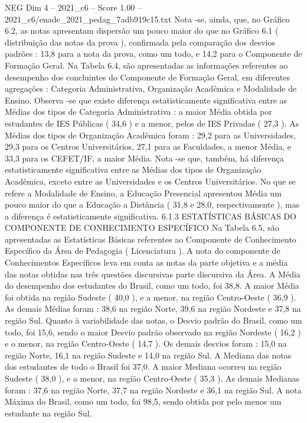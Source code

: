 \begin{textsample}{NEG Dim 4 – 2021\_c6 – Score 1.00 – 2021\_c6/enade\_2021\_pedag\_7adb919c15.txt}
Nota -se, ainda, que, no Gráfico 6.2, as notas apresentam dispersão um pouco maior do que no Gráfico 6.1 ( distribuição das notas da prova ), confirmada pela comparação dos desvios padrões : 13,8 para a nota da prova, como um todo, e 14,2 para o Componente de Formação Geral.
Na Tabela 6.4, são apresentadas as informações referentes ao desempenho dos concluintes do Componente de Formação Geral, em diferentes agregações : Categoria Administrativa, Organização Acadêmica e Modalidade de Ensino.
Observa -se que existe diferença estatisticamente significativa entre as Médias dos tipos de Categoria Administrativa : a maior Média obtida por estudantes de IES Públicas ( 34,6 ) e a menor, pelos de IES Privadas ( 27,3 ).
As Médias dos tipos de Organização Acadêmica foram : 29,2 para as Universidades, 29,3 para os Centros Universitários, 27,1 para as Faculdades, a menor Média, e 33,3 para os CEFET/IF, a maior Média.
Nota -se que, também, há diferença estatisticamente significativa entre as Médias dos tipos de Organização Acadêmica, exceto entre as Universidades e os Centros Universitários.
No que se refere a Modalidade de Ensino, a Educação Presencial apresentou Média um pouco maior do que a Educação a Distância ( 31,8 e 28,0, respectivamente ), mas a diferença é estatisticamente significativa. 6.1.3 ESTATÍSTICAS BÁSICAS DO COMPONENTE DE CONHECIMENTO ESPECÍFICO Na Tabela 6.5, são apresentadas as Estatísticas Básicas referentes ao Componente de Conhecimento Específico da Área de Pedagogia ( Licenciatura ).
A nota do componente de Conhecimentos Específicos leva em conta as notas da parte objetiva e a média das notas obtidas nas três questões discursivas parte discursiva da Área.
A Média do desempenho dos estudantes do Brasil, como um todo, foi 38,8.
A maior Média foi obtida na região Sudeste ( 40,0 ), e a menor, na região Centro-Oeste ( 36,9 ).
As demais Médias foram : 38,6 na região Norte, 39,6 na região Nordeste e 37,8 na região Sul.
Quanto à variabilidade das notas, o Desvio padrão do Brasil, como um todo, foi 15,6, sendo o maior Desvio padrão observado na região Nordeste ( 16,2 ) e o menor, na região Centro-Oeste ( 14,7 ).
Os demais desvios foram : 15,0 na região Norte, 16,1 na região Sudeste e 14,0 na região Sul.
A Mediana das notas dos estudantes de todo o Brasil foi 37,0.
A maior Mediana ocorreu na região Sudeste ( 38,0 ), e a menor, na região Centro-Oeste ( 35,3 ).
As demais Medianas foram : 37,6 na região Norte, 37,7 na região Nordeste e 36,1 na região Sul.
A nota Máxima do Brasil, como um todo, foi 98,5, sendo obtida por pelo menos um estudante na região Sul.

\end{textsample}

